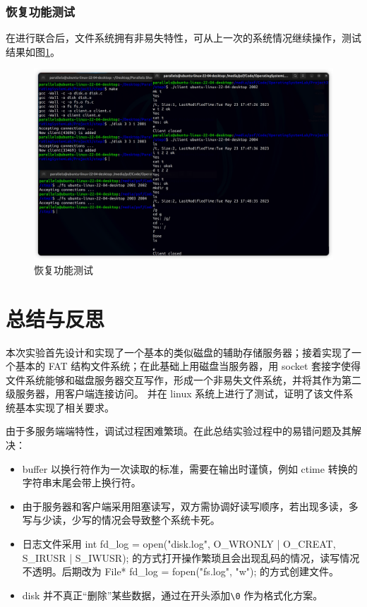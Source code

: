 \documentclass{article}
\begin{document}
\subsubsection{恢复功能测试}

在进行联合后，文件系统拥有非易失特性，可从上一次的系统情况继续操作，测试结果如图\ref{s3-t4}。

\begin{figure}[H]
\center
\includegraphics[scale = 0.3]{s3-t4.png}
\caption{恢复功能测试}
\label{s3-t4}
\end{figure}

\newpage
\section*{总结与反思}
\setlength{\parindent}{2em}

本次实验首先设计和实现了一个基本的类似磁盘的辅助存储服务器；接着实现了一个基本的 FAT 结构文件系统；在此基础上用磁盘当服务器，用 socket 套接字使得文件系统能够和磁盘服务器交互写作，形成一个非易失文件系统，并将其作为第二级服务器，用客户端连接访问。 并在 linux 系统上进行了测试，证明了该文件系统基本实现了相关要求。

由于多服务端端特性，调试过程困难繁琐。在此总结实验过程中的易错问题及其解决：

\begin{itemize}
	\item buffer 以换行符作为一次读取的标准，需要在输出时谨慎，例如 ctime 转换的字符串末尾会带上换行符。
	\item 由于服务器和客户端采用阻塞读写，双方需协调好读写顺序，若出现多读，多写与少读，少写的情况会导致整个系统卡死。
	\item 日志文件采用 int fd\_log = open("disk.log", O\_WRONLY | O\_CREAT, S\_IRUSR | S\_IWUSR); 的方式打开操作繁琐且会出现乱码的情况，读写情况不透明。后期改为 File* fd\_log = fopen("fs.log", "w"); 的方式创建文件。
	\item disk 并不真正“删除”某些数据，通过在开头添加\verb |\0| 作为格式化方案。
\end{itemize}
\end{document}
